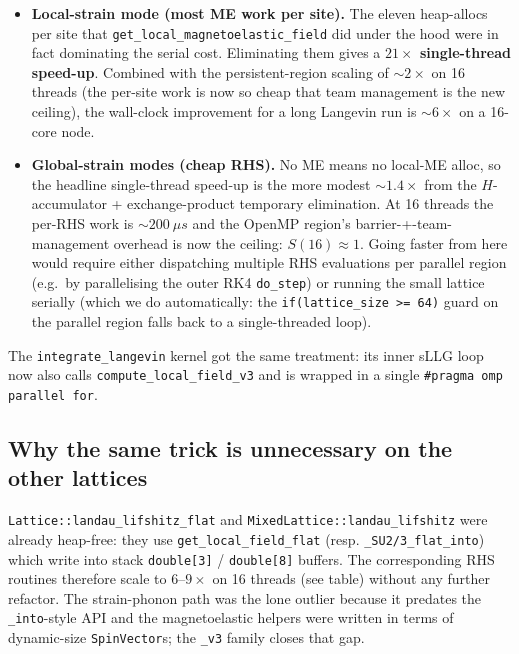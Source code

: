 \documentclass[11pt,letterpaper]{article}
\begin{document}
\begin{itemize}[noitemsep]
  \item \textbf{Local-strain mode (most ME work per site).}  The
        eleven heap-allocs per site that
        \texttt{get\_local\_magnetoelastic\_field} did under the hood
        were in fact dominating the serial cost.  Eliminating them
        gives a \textbf{$21\times$ single-thread speed-up}.  Combined
        with the persistent-region scaling of $\sim 2\times$ on 16
        threads (the per-site work is now so cheap that team
        management is the new ceiling), the wall-clock improvement
        for a long Langevin run is \textbf{$\sim 6\times$} on a
        16-core node.
  \item \textbf{Global-strain modes (cheap RHS).}  No ME means no
        local-ME alloc, so the headline single-thread speed-up is
        the more modest $\sim 1.4\times$ from the
        $H$-accumulator + exchange-product temporary elimination.
        At 16 threads the per-RHS work is $\sim 200~\mu s$ and the
        OpenMP region's barrier-+-team-management overhead is now
        the ceiling: $S(16) \approx 1$.  Going faster from here
        would require either dispatching multiple RHS evaluations
        per parallel region (e.g.~by parallelising the outer RK4
        \texttt{do\_step}) or running the small lattice serially
        (which we do automatically: the
        \texttt{if(lattice\_size >= 64)} guard on the parallel
        region falls back to a single-threaded loop).
\end{itemize}

The \texttt{integrate\_langevin} kernel got the same treatment: its
inner sLLG loop now also calls \texttt{compute\_local\_field\_v3}
and is wrapped in a single \texttt{\#pragma omp parallel for}.

\subsection{Why the same trick is unnecessary on the other lattices}

\texttt{Lattice::landau\_lifshitz\_flat} and
\texttt{MixedLattice::landau\_lifshitz} were already heap-free:
they use \texttt{get\_local\_field\_flat} (resp.
\texttt{\_SU2/3\_flat\_into}) which write into stack
\texttt{double[3]} / \texttt{double[8]} buffers.  The corresponding
RHS routines therefore scale to $6$--$9\times$ on 16 threads (see
table) without any further refactor.  The strain-phonon path was
the lone outlier because it predates the
\texttt{\_into}-style API and the magnetoelastic helpers were
written in terms of dynamic-size \texttt{SpinVector}s; the
\texttt{\_v3} family closes that gap.
\end{document}
